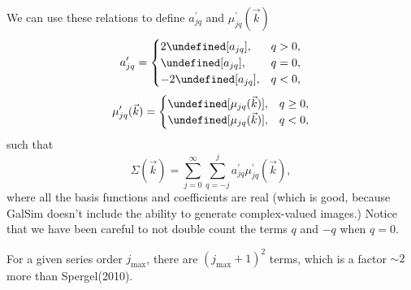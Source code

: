 \documentclass{article}
\let\Re\undefined
\DeclareMathOperator{\Re}{Re}
\let\Im\undefined
\DeclareMathOperator{\Im}{Im}
\begin{document}
We can use these relations to define $a^\prime_{jq}$ and $\mu^\prime_{jq}(\vec{k})$
\[
a^\prime_{jq} =
\begin{cases}
  2 \Re[a_{jq}], & q > 0, \\
  \Re[a_{jq}], & q = 0, \\
  -2 \Im[a_{jq}], & q < 0,
\end{cases}
\]
\[
\mu^\prime_{jq}(\vec{k}) =
\begin{cases}
  \Re[\mu_{jq}(\vec{k})], & q \ge 0, \\
  \Im[\mu_{jq}(\vec{k})], & q < 0,
\end{cases}
\]
such that
\begin{equation}
  \label{eqn:sum_jqprime}
  \Sigma(\vec{k}) = \sum_{j=0}^{\infty}\sum_{q=-j}^{j} a^\prime_{jq}\mu^\prime_{jq}(\vec{k}),
\end{equation}
where all the basis functions and coefficients are real (which is good, because GalSim doesn't include the ability to generate complex-valued images.)
Notice that we have been careful to not double count the terms $q$ and $-q$ when $q=0$.

For a given series order $j_\mathrm{max}$, there are $(j_\mathrm{max}+1)^2$ terms, which is a factor $\sim 2$ more than Spergel(2010).
\end{document}
